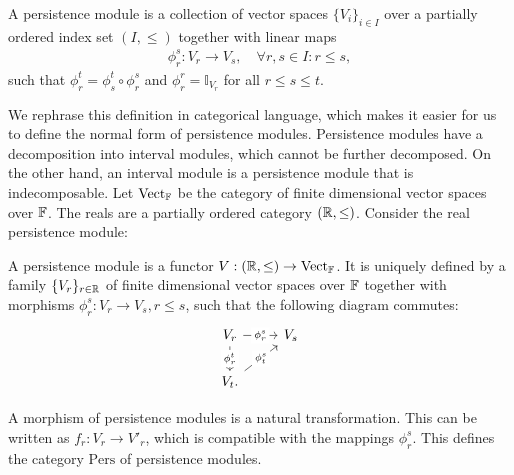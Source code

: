 \begin{definition}{\cite[\S 1.1]{chazal2016structure}}
A persistence module is a collection of vector spaces $\{V_i\}_{i \in I}$ over a partially ordered index set $(I,\leq)$ together with linear maps
\begin{align}
\phi_{r}^{s}: V_r \rightarrow V_s, \quad \forall r,s \in I: r \leq s,
\end{align}
such that $\phi_{r}^{t} = \phi^{t}_{s} \circ \phi_{r}^{s}$ and $\phi_{r}^r = \mathbb{I}_{V_r}$ for all $r \leq s \leq t$.
\end{definition}

We rephrase this definition in categorical language, which makes it easier for us to define the normal form of persistence modules. Persistence modules have a decomposition into interval modules, which cannot be further decomposed. On the other hand, an interval module is a persistence module that is indecomposable. Let $\text{Vect}_{\mathbb{F}}$ be the category of finite dimensional vector spaces over ${\mathbb{F}}$. The reals are a partially ordered category $({\mathbb{R}}, \leq)$. Consider the real persistence module:

\begin{definition}{\cite[\S 1.3]{chazal2016structure}}
A persistence module is a functor $V: ({\mathbb{R}},\leq) \rightarrow \text{Vect}_{\mathbb{F}}$. It is uniquely defined by a family $\{V_r\}_{r\in{\mathbb{R}}}$ of finite dimensional vector spaces over ${\mathbb{F}}$ together with morphisms $\phi_{r}^{s}: V_r \rightarrow V_s, r \leq s$, such that the following diagram commutes:
\begin{equation}
\begin{tikzcd}
V_r \arrow[d, "{\phi_{r}^{t}}" description] \arrow[r, "{\phi_{r}^{s}}" description] & V_s \\
V_t. \arrow[ru, "{\phi_{t}^{s}}" description]                                      &    
\end{tikzcd}
\end{equation}
\end{definition}

\begin{remark}
A morphism of persistence modules is a natural transformation. This can be written as $f_r: V_r \rightarrow V'_r$, which is compatible with the mappings $\phi_{r}^{s}$. This defines the category $\mathrm{Pers}$ of persistence modules.
\end{remark}

